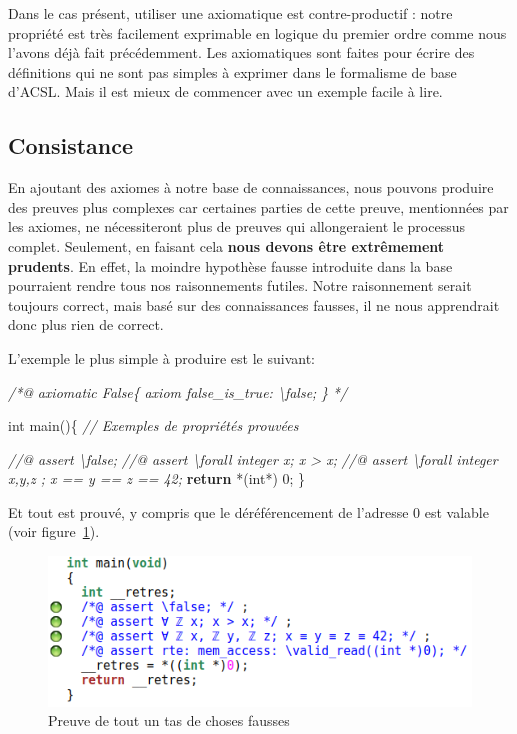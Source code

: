 \documentclass[12pt,francais,]{scrbook}
\newenvironment{Shaded}{}{}
\newcommand{\KeywordTok}[1]{\textcolor[rgb]{0.00,0.44,0.13}{\textbf{{#1}}}}
\newcommand{\DataTypeTok}[1]{\textcolor[rgb]{0.56,0.13,0.00}{{#1}}}
\newcommand{\DecValTok}[1]{\textcolor[rgb]{0.25,0.63,0.44}{{#1}}}
\newcommand{\CommentTok}[1]{\textcolor[rgb]{0.38,0.63,0.69}{\textit{{#1}}}}
\newcommand{\NormalTok}[1]{{#1}}
\begin{document}
Dans le cas présent, utiliser une axiomatique est contre-productif :
notre propriété est très facilement exprimable en logique du premier
ordre comme nous l'avons déjà fait précédemment. Les axiomatiques sont
faites pour écrire des définitions qui ne sont pas simples à exprimer
dans le formalisme de base d'ACSL. Mais il est mieux de commencer avec
un exemple facile à lire.

\subsection{Consistance}\label{consistance}

En ajoutant des axiomes à notre base de connaissances, nous pouvons
produire des preuves plus complexes car certaines parties de cette
preuve, mentionnées par les axiomes, ne nécessiteront plus de preuves
qui allongeraient le processus complet. Seulement, en faisant cela
\textbf{nous devons être extrêmement prudents}. En effet, la moindre
hypothèse fausse introduite dans la base pourraient rendre tous nos
raisonnements futiles. Notre raisonnement serait toujours correct, mais
basé sur des connaissances fausses, il ne nous apprendrait donc plus
rien de correct.

L'exemple le plus simple à produire est le suivant:

\begin{footnotesize}\begin{Shaded}
\begin{Highlighting}[]
\CommentTok{/*@}
\CommentTok{  axiomatic False\{}
\CommentTok{    axiom false_is_true: \textbackslash{}false;}
\CommentTok{  \}}
\CommentTok{*/}

\DataTypeTok{int} \NormalTok{main()\{}
  \CommentTok{// Exemples de propriétés prouvées}

  \CommentTok{//@ assert \textbackslash{}false;}
  \CommentTok{//@ assert \textbackslash{}forall integer x; x > x;}
  \CommentTok{//@ assert \textbackslash{}forall integer x,y,z ; x == y == z == 42;}
  \KeywordTok{return} \NormalTok{*(}\DataTypeTok{int}\NormalTok{*) }\DecValTok{0}\NormalTok{;}
\NormalTok{\}}
\end{Highlighting}
\end{Shaded}\end{footnotesize}

Et tout est prouvé, y compris que le déréférencement de l'adresse 0 est
valable (voir figure~\ref{fig:false-axiom}).

\begin{figure}[htbp]
\centering
\includegraphics[scale=0.5]{false_axiom.png}
\caption{Preuve de tout un tas de choses fausses}
\label{fig:false-axiom}
\end{figure}
\end{document}
